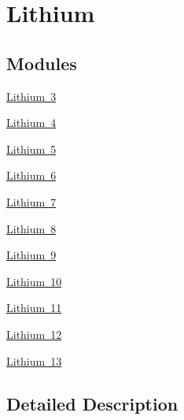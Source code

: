 \hypertarget{group___isotope_const-_lithium}{}\section{Lithium}
\label{group___isotope_const-_lithium}
\subsection*{Modules}
\begin{DoxyCompactItemize}
\item 
\mbox{\hyperlink{group___isotope_const-_lithium-_li3}{Lithium 3}}
\item 
\mbox{\hyperlink{group___isotope_const-_lithium-_li4}{Lithium 4}}
\item 
\mbox{\hyperlink{group___isotope_const-_lithium-_li5}{Lithium 5}}
\item 
\mbox{\hyperlink{group___isotope_const-_lithium-_li6}{Lithium 6}}
\item 
\mbox{\hyperlink{group___isotope_const-_lithium-_li7}{Lithium 7}}
\item 
\mbox{\hyperlink{group___isotope_const-_lithium-_li8}{Lithium 8}}
\item 
\mbox{\hyperlink{group___isotope_const-_lithium-_li9}{Lithium 9}}
\item 
\mbox{\hyperlink{group___isotope_const-_lithium-_li10}{Lithium 10}}
\item 
\mbox{\hyperlink{group___isotope_const-_lithium-_li11}{Lithium 11}}
\item 
\mbox{\hyperlink{group___isotope_const-_lithium-_li12}{Lithium 12}}
\item 
\mbox{\hyperlink{group___isotope_const-_lithium-_li13}{Lithium 13}}
\end{DoxyCompactItemize}


\subsection{Detailed Description}
